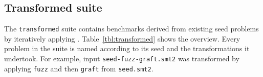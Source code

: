     

\vspace{-0.2in}
\subsection{Transformed suite}
\vspace{-0.1in}
    The \texttt{transformed} suite contains benchmarks derived from existing seed problems by iteratively applying \transformer{}. Table~\ref{tbl:transformed} shows the overview. Every problem in the suite is named according to its seed and the transformations it undertook. For example, input \texttt{seed-fuzz-graft.smt2} was transformed by applying \texttt{fuzz} and then \texttt{graft} from \texttt{seed.smt2}. 

